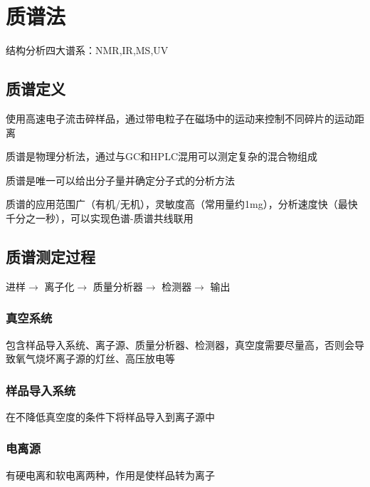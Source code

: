 \section{质谱法}%
\label{sec:质谱法}
\begin{notation}
    结构分析四大谱系：NMR,IR,MS,UV
\end{notation}
\subsection{质谱定义}%
\label{sub:质谱定义}
使用高速电子流击碎样品，通过带电粒子在磁场中的运动来控制不同碎片的运动距离
\begin{notation}
    质谱是物理分析法，通过与GC和HPLC混用可以测定复杂的混合物组成
\end{notation}
\begin{notation}
    质谱是唯一可以给出分子量并确定分子式的分析方法
\end{notation}
质谱的应用范围广（有机/无机），灵敏度高（常用量约1mg），分析速度快（最快千分之一秒），可以实现色谱-质谱共线联用
\subsection{质谱测定过程}%
\label{sub:质谱测定过程}
进样$\to $ 离子化$\to $ 质量分析器$\to $ 检测器$\to $ 输出
\subsubsection{真空系统}%
\label{ssub*:真空系统}
包含样品导入系统、离子源、质量分析器、检测器，真空度需要尽量高，否则会导致氧气烧坏离子源的灯丝、高压放电等
\subsubsection{样品导入系统}%
\label{ssub*:样品导入系统}
在不降低真空度的条件下将样品导入到离子源中
\subsubsection{电离源}%
\label{ssub*:电离源}
有硬电离和软电离两种，作用是使样品转为离子

